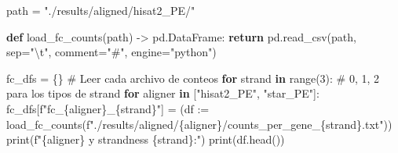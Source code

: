 \documentclass[
  12pt,
  letterpaper,
  DIV=11,
  numbers=noendperiod]{scrartcl}
\newenvironment{Shaded}{\begin{snugshade}}{\end{snugshade}}
\newcommand{\BuiltInTok}[1]{\textcolor[rgb]{0.00,0.23,0.31}{#1}}
\newcommand{\CharTok}[1]{\textcolor[rgb]{0.13,0.47,0.30}{#1}}
\newcommand{\CommentTok}[1]{\textcolor[rgb]{0.37,0.37,0.37}{#1}}
\newcommand{\ControlFlowTok}[1]{\textcolor[rgb]{0.00,0.23,0.31}{\textbf{#1}}}
\newcommand{\DecValTok}[1]{\textcolor[rgb]{0.68,0.00,0.00}{#1}}
\newcommand{\KeywordTok}[1]{\textcolor[rgb]{0.00,0.23,0.31}{\textbf{#1}}}
\newcommand{\NormalTok}[1]{\textcolor[rgb]{0.00,0.23,0.31}{#1}}
\newcommand{\OperatorTok}[1]{\textcolor[rgb]{0.37,0.37,0.37}{#1}}
\newcommand{\SpecialCharTok}[1]{\textcolor[rgb]{0.37,0.37,0.37}{#1}}
\newcommand{\SpecialStringTok}[1]{\textcolor[rgb]{0.13,0.47,0.30}{#1}}
\newcommand{\StringTok}[1]{\textcolor[rgb]{0.13,0.47,0.30}{#1}}
\begin{document}
\begin{Shaded}
\begin{Highlighting}[]
\NormalTok{path }\OperatorTok{=} \StringTok{"./results/aligned/hisat2\_PE/"}

\KeywordTok{def}\NormalTok{ load\_fc\_counts(path) }\OperatorTok{{-}\textgreater{}}\NormalTok{ pd.DataFrame:}
  \ControlFlowTok{return}\NormalTok{ pd.read\_csv(path, sep}\OperatorTok{=}\StringTok{"}\CharTok{\textbackslash{}t}\StringTok{"}\NormalTok{, comment}\OperatorTok{=}\StringTok{"\#"}\NormalTok{, engine}\OperatorTok{=}\StringTok{"python"}\NormalTok{)}

\NormalTok{fc\_dfs }\OperatorTok{=}\NormalTok{ \{\}}
\CommentTok{\# Leer cada archivo de conteos}
\ControlFlowTok{for}\NormalTok{ strand }\KeywordTok{in} \BuiltInTok{range}\NormalTok{(}\DecValTok{3}\NormalTok{): }\CommentTok{\# 0, 1, 2 para los tipos de strand}
  \ControlFlowTok{for}\NormalTok{ aligner }\KeywordTok{in}\NormalTok{ [}\StringTok{"hisat2\_PE"}\NormalTok{, }\StringTok{"star\_PE"}\NormalTok{]:}
\NormalTok{    fc\_dfs[}\SpecialStringTok{f"fc\_}\SpecialCharTok{\{}\NormalTok{aligner}\SpecialCharTok{\}}\SpecialStringTok{\_}\SpecialCharTok{\{}\NormalTok{strand}\SpecialCharTok{\}}\SpecialStringTok{"}\NormalTok{] }\OperatorTok{=}\NormalTok{ (df }\OperatorTok{:=}\NormalTok{ load\_fc\_counts(}\SpecialStringTok{f"./results/aligned/}\SpecialCharTok{\{}\NormalTok{aligner}\SpecialCharTok{\}}\SpecialStringTok{/counts\_per\_gene\_}\SpecialCharTok{\{}\NormalTok{strand}\SpecialCharTok{\}}\SpecialStringTok{.txt"}\NormalTok{))}
    \BuiltInTok{print}\NormalTok{(}\SpecialStringTok{f"}\SpecialCharTok{\{}\NormalTok{aligner}\SpecialCharTok{\}}\SpecialStringTok{ y strandness }\SpecialCharTok{\{}\NormalTok{strand}\SpecialCharTok{\}}\SpecialStringTok{:"}\NormalTok{)}
    \BuiltInTok{print}\NormalTok{(df.head())}
\end{Highlighting}
\end{Shaded}
\end{document}
